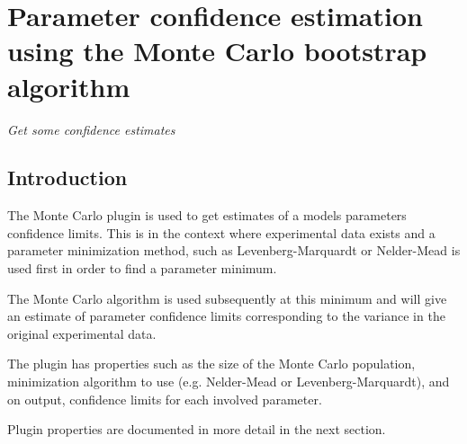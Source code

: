 
\newcommand{\pname}{Monte Carlo}

\chapter*{Parameter confidence estimation using the Monte Carlo bootstrap algorithm}
\setcounter{chapter}{1}
\emph{Get some confidence estimates}
\section{Introduction}
The Monte Carlo plugin is used to get estimates of a models parameters confidence limits. This is in the context where experimental data exists and a parameter minimization method, such as Levenberg-Marquardt or Nelder-Mead is used first in order to find a parameter minimum. 

The Monte Carlo algorithm is used subsequently at this minimum and will give an estimate of parameter confidence limits corresponding to the variance in the original experimental data.

The plugin has properties such as the size of the Monte Carlo population, minimization algorithm to use (e.g. Nelder-Mead or Levenberg-Marquardt), and on output, confidence limits for each involved parameter.

Plugin properties are documented in more detail in the next section.

